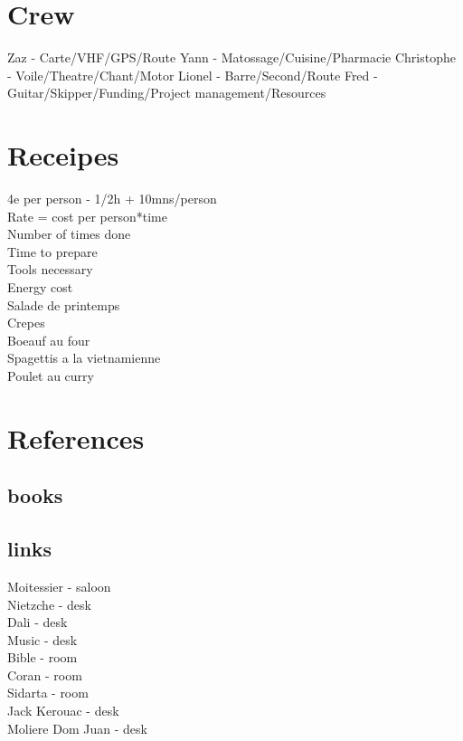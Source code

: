 \documentclass[8pt]{article} %
\begin{document}
\begin{calendar}{\hsize}

\day{}{} %

 
\finishCalendar
\end{calendar}


\section{Crew}
Zaz - Carte/VHF/GPS/Route
Yann - Matossage/Cuisine/Pharmacie
Christophe - Voile/Theatre/Chant/Motor
Lionel - Barre/Second/Route
Fred - Guitar/Skipper/Funding/Project management/Resources


\section{Receipes}

4e per person - 1/2h  + 10mns/person\\
Rate = cost per person*time \\
Number of times done\\
Time to prepare\\
Tools necessary\\
Energy cost\\

Salade de printemps\\
Crepes\\
Boeauf au four\\
Spagettis a la vietnamienne\\
Poulet au curry\\

\section{References}
\subsection{books}
\subsection{links}

Moitessier - saloon\\
Nietzche - desk\\
Dali - desk\\
Music - desk\\
Bible - room\\
Coran - room\\
Sidarta - room\\
Jack Kerouac - desk\\
Moliere Dom Juan - desk\\
\end{document}
